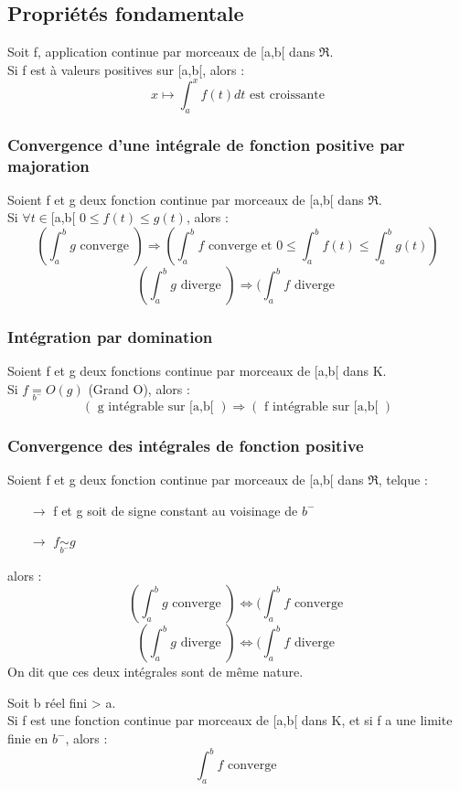 \subsection{Propriétés fondamentale}
\begin{prop}
Soit f, application continue par morceaux de [a,b[ dans $\Re$.\\
Si f est à valeurs positives sur [a,b[, alors :
$$x \mapsto \int_a^x f(t)dt \mbox{ est croissante}$$  
\end{prop}
\subsubsection{Convergence d'une intégrale de fonction positive par majoration}
\begin{prop}
Soient f et g deux fonction continue par morceaux de [a,b[ dans $\Re$.\\
Si $\forall t \in$[a,b[ $0 \leq f(t)\leq g(t)$, alors : 
$$( \int_a^b g \mbox{ converge } ) \Rightarrow (\int_a^b f \mbox{ converge et } 0 \leq \int_a^bf(t)\leq \int_a^bg(t) )$$ 
$$( \int_a^b g \mbox{ diverge } ) \Rightarrow (\int_a^b f \mbox{ diverge }$$
\end{prop}
\subsubsection{Intégration par domination}
\begin{prop}
Soient f et g deux fonctions continue par morceaux de [a,b[ dans K.\\
Si $f \underset{b^-}= O(g)$ (Grand O), alors :
$$(\mbox{ g intégrable sur [a,b[ })\Rightarrow(\mbox{ f intégrable sur [a,b[ })$$
\end{prop}
\subsubsection{Convergence des intégrales de fonction positive}
\begin{prop}
Soient f et g deux fonction continue par morceaux de [a,b[ dans $\Re$, telque : 
\begin{itemize}
 \item[$\rightarrow$]f et g soit de signe constant au voisinage de $b^-$
 \item[$\rightarrow$]$f \underset{b^-}\sim g$
\end{itemize}
alors :
$$( \int_a^b g \mbox{ converge } ) \Leftrightarrow (\int_a^b f \mbox{ converge }$$
$$( \int_a^b g \mbox{ diverge } ) \Leftrightarrow (\int_a^b f \mbox{ diverge }$$
On dit que ces deux intégrales sont de même nature.
\end{prop}
\begin{prop}
Soit b réel fini > a.\\
Si f est une fonction continue par morceaux de [a,b[ dans K, et si f a une limite finie en $b^-$, alors :
$$\int_a^b f \mbox{ converge }$$
\end{prop}
